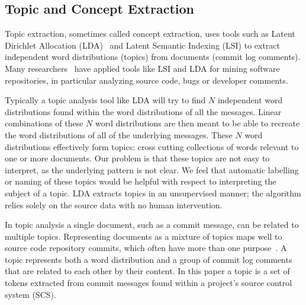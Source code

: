\documentclass{acm_proc_article-sp}
\begin{document}
\subsection{Topic and Concept Extraction}
Topic extraction, sometimes called concept extraction, uses tools such as Latent Dirichlet Allocation (LDA)~\cite{Blei2003} and Latent Semantic Indexing (LSI) to extract
independent word distributions (topics) from
	documents (commit log comments). Many researchers~\cite{marcus04wcre,Poshyvanyk2007,lukins08wcre,Linstead2007} have applied tools like LSI and LDA for mining software repositories, in particular analyzing source code, bugs or developer comments.

Typically a topic analysis tool like LDA will try to find $N$ independent word distributions found within the word distributions of all the messages. Linear combinations of these $N$ word distributions are then meant to be able to recreate the word distributions of all of the underlying messages. These $N$ word distributions effectively form topics: cross cutting collections of words relevant to one or more documents. Our problem is that these topics are not easy to interpret, as the underlying pattern is not clear. We feel that automatic labelling or naming of these topics would be helpful with respect to interpreting the subject of a topic. LDA extracts topics in an unsupervised manner; the algorithm relies solely on the source data with no human intervention.

In topic analysis a single document, such as a commit message, can be related to multiple topics. Representing documents as a mixture of topics maps well to source code repository commits, which often have more than one purpose~\cite{Hindle09ICSM}.  A topic represents both a word distribution and a group of commit log comments that are related to each other by their content.  In this paper a topic is a set of tokens extracted from commit messages found within a project's source control system (SCS).

\end{document}
